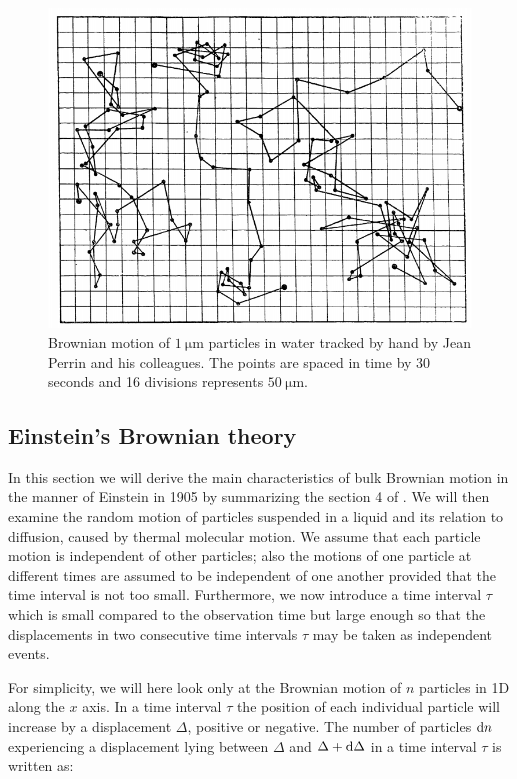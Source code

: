 \begin{figure}[h]
	\centering
	\includegraphics[scale=0.6]{02_body/chapter1/image/graph_perrin.png}
	\caption{Brownian motion of $1 ~ \mathrm{\mu m}$ particles in water tracked by hand by Jean Perrin and his colleagues. The points are spaced in time by 30 seconds and 16 divisions represents $50 ~ \mathrm{\mu m}$.}
	\label{fig:Perrin_Brownian}
\end{figure}

\subsection{Einstein's Brownian theory}

In this section we will derive the main characteristics of bulk Brownian motion in the manner of Einstein in 1905 by summarizing the section 4 of \cite{einstein_uber_1905}. We will then examine  the random motion of particles suspended in a liquid and its relation to diffusion, caused by thermal molecular motion. We assume that each particle motion is independent of other particles; also the motions of one particle at different times are assumed to be independent of one another provided that the time interval is not too small. Furthermore, we now introduce a time interval $\tau$ which is small compared to the observation time but large enough so that  the displacements in two consecutive time intervals $\tau$ may be taken as independent events. 

For simplicity, we will here look only at the Brownian motion of $n$ particles in 1D along the $x$ axis. In a time interval $\tau$ the position of each individual particle will increase by a displacement $\Delta$, positive or negative. The number of particles $\textnormal{d}n$ experiencing a displacement lying between $\Delta$ and $\Delta + \textnormal{d}\Delta$ in a time interval $\tau$ is written as:

